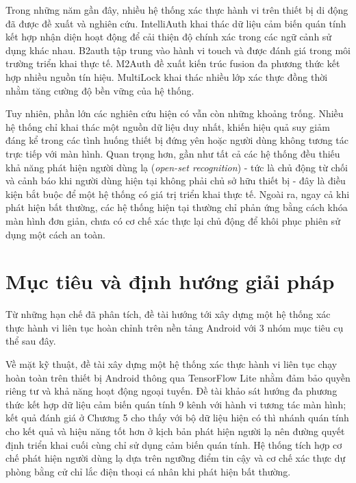 \documentclass[../DoAn.tex]{subfiles}
\begin{document}
Trong những năm gần đây, nhiều hệ thống xác thực hành vi trên thiết bị di động đã được đề xuất và nghiên cứu. IntelliAuth \cite{intelliauth} khai thác dữ liệu cảm biến quán tính kết hợp nhận diện hoạt động để cải thiện độ chính xác trong các ngữ cảnh sử dụng khác nhau. B2auth \cite{b2auth} tập trung vào hành vi touch và được đánh giá trong môi trường triển khai thực tế. M2Auth \cite{m2auth} đề xuất kiến trúc fusion đa phương thức kết hợp nhiều nguồn tín hiệu. MultiLock \cite{multilock} khai thác nhiều lớp xác thực đồng thời nhằm tăng cường độ bền vững của hệ thống.

Tuy nhiên, phần lớn các nghiên cứu hiện có vẫn còn những khoảng trống. Nhiều hệ thống chỉ khai thác một nguồn dữ liệu duy nhất, khiến hiệu quả suy giảm đáng kể trong các tình huống thiết bị đứng yên hoặc người dùng không tương tác trực tiếp với màn hình. Quan trọng hơn, gần như tất cả các hệ thống đều thiếu khả năng phát hiện người dùng lạ (\textit{open-set recognition}) - tức là chủ động từ chối và cảnh báo khi người dùng hiện tại không phải chủ sở hữu thiết bị - đây là điều kiện bắt buộc để một hệ thống có giá trị triển khai thực tế. Ngoài ra, ngay cả khi phát hiện bất thường, các hệ thống hiện tại thường chỉ phản ứng bằng cách khóa màn hình đơn giản, chưa có cơ chế xác thực lại chủ động để khôi phục phiên sử dụng một cách an toàn.

\section{Mục tiêu và định hướng giải pháp}
\label{sec:muctieu}

Từ những hạn chế đã phân tích, đề tài hướng tới xây dựng một hệ thống xác thực hành vi liên tục hoàn chỉnh trên nền tảng Android với 3 nhóm mục tiêu cụ thể sau đây.

Về mặt kỹ thuật, đề tài xây dựng một hệ thống xác thực hành vi liên tục chạy hoàn toàn trên thiết bị Android thông qua TensorFlow Lite nhằm đảm bảo quyền riêng tư và khả năng hoạt động ngoại tuyến. Đề tài khảo sát hướng đa phương thức kết hợp dữ liệu cảm biến quán tính 9 kênh với hành vi tương tác màn hình; kết quả đánh giá ở Chương 5 cho thấy với bộ dữ liệu hiện có thì nhánh quán tính cho kết quả và hiệu năng tốt hơn ở kịch bản phát hiện người lạ nên đường quyết định triển khai cuối cùng chỉ sử dụng cảm biến quán tính. Hệ thống tích hợp cơ chế phát hiện người dùng lạ dựa trên ngưỡng điểm tin cậy và cơ chế xác thực dự phòng bằng cử chỉ lắc điện thoại cá nhân khi phát hiện bất thường.
\end{document}
